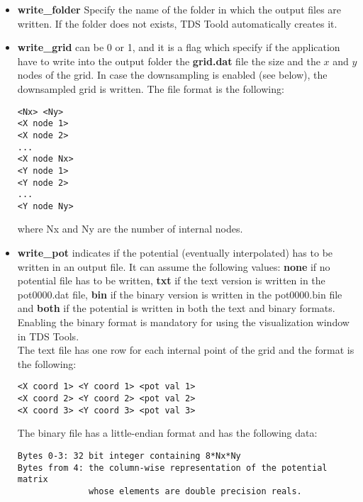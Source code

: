 \documentclass[a4paper,11pt]{article}
\begin{document}
\begin{itemize}
  \item \textbf{write\_folder} Specify the name of the folder in which the output files are written. If the folder does not exists, TDS Toold automatically creates it.
  \item \textbf{write\_grid} can be 0 or 1, and it is a flag which specify if the application have to write into the output folder the \textbf{grid.dat} file the size and the $x$ and $y$ nodes of the grid. In case the downsampling is enabled (see below), the downsampled grid is written. The file format is the following:
\begin{verbatim}
<Nx> <Ny>
<X node 1>
<X node 2>
...
<X node Nx>
<Y node 1>
<Y node 2>
...
<Y node Ny>
\end{verbatim}
  where Nx and Ny are the number of internal nodes.

  \item \textbf{write\_pot} indicates if the potential (eventually interpolated) has to be written in an output file. It can assume the following values: \textbf{none} if no potential file has to be written, \textbf{txt} if the text version is written in the pot0000.dat file, \textbf{bin} if the binary version is written in the pot0000.bin file and \textbf{both} if the potential is written in both the text and binary formats. Enabling the binary format is mandatory for using the visualization window in TDS Tools. \\
  The text file has one row for each internal point of the grid and the format is the following:
\begin{verbatim}
<X coord 1> <Y coord 1> <pot val 1>
<X coord 2> <Y coord 2> <pot val 2>
<X coord 3> <Y coord 3> <pot val 3>
\end{verbatim}
The binary file has a little-endian format and has the following data:
\begin{verbatim}
Bytes 0-3: 32 bit integer containing 8*Nx*Ny
Bytes from 4: the column-wise representation of the potential matrix
              whose elements are double precision reals.
\end{verbatim}


\end{itemize}
\end{document}
